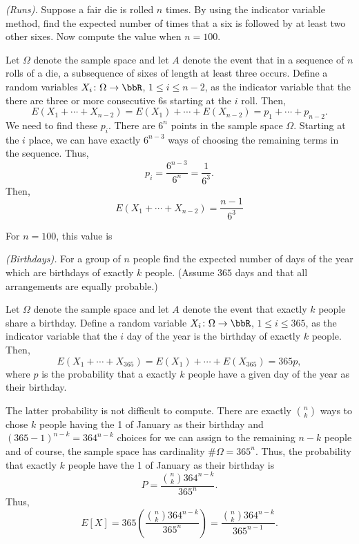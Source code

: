 \begin{problem}[Handout 6, \# 9]
  \emph{(Runs).} Suppose a fair die is rolled \(n\) times. By using the
  indicator variable method, find the expected number of times that a six
  is followed by at least two other sixes. Now compute the value when
  \(n=100\).
\end{problem}
\begin{solution}
  Let \(\Omega\) denote the sample space and let \(A\) denote the event
  that in a sequence of \(n\) rolls of a die, a subsequence of sixes of
  length at least three occurs. Define a random variables
  \(X_i\colon\Omega\to\bbR\), \(1\leq i\leq n-2\), as the indicator
  variable that the there are three or more consecutive \(6\)s starting at
  the \(i\) roll. Then,
  \[
    E(X_1+\dotsb+X_{n-2})=E(X_1)+\dotsb+E(X_{n-2})=p_1+\dotsb+p_{n-2}.
  \]
  We need to find these \(p_i\). There are \(6^n\) points in the sample
  space \(\Omega\). Starting at the \(i\) place, we can have
  exactly \(6^{n-3}\) ways of choosing the remaining terms in the
  sequence. Thus,
  \[
    p_i=\frac{6^{n-3}}{6^n}=\frac{1}{6^3}.
  \]
  Then,
  \[
    E(X_1+\dotsb+X_{n-2})=\frac{n-1}{6^3}
  \]

  For \(n=100\), this value is
  \[
  \]
\end{solution}
\newpage

\begin{problem}[Handout 6, \# 10]
  \emph{(Birthdays).} For a group of \(n\) people find the expected number
  of days of the year which are birthdays of exactly \(k\) people. (Assume
  \(365\) days and that all arrangements are equally probable.)
\end{problem}
\begin{solution}
  Let \(\Omega\) denote the sample space and let \(A\) denote the event
  that exactly \(k\) people share a birthday. Define a random variable
  \(X_i\colon\Omega\to\bbR\), \(1\leq i\leq 365\), as the indicator
  variable that the \(i\) day of the year is the birthday of
  exactly \(k\) people. Then,
  \[
    E(X_1+\dotsb+X_{365})=E(X_1)+\dotsb+E(X_{365})=365p,
  \]
  where \(p\) is the probability that a exactly \(k\) people have a given
  day of the year as their birthday.

  The latter probability is not difficult to compute. There are exactly
  \(\binom{n}{k}\) ways to chose \(k\) people having the 1 of
  January as their birthday and \((365-1)^{n-k}=364^{n-k}\) choices for we
  can assign to the remaining \(n-k\) people and of course, the sample
  space has cardinality \(\#\Omega=365^n\). Thus, the probability that
  exactly \(k\) people have the 1 of January as their birthday
  is
  \[
    P=\frac{\binom{n}{k}364^{n-k}}{365^n}.
  \]
  Thus,
  \[
    E[X]
    =365\left(\frac{\binom{n}{k}364^{n-k}}{365^n}\right)
    =\frac{\binom{n}{k}364^{n-k}}{365^{n-1}}.
  \]
\end{solution}
\newpage

